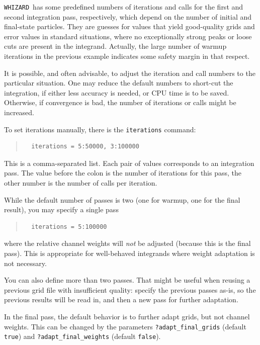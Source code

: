 \documentclass[12pt]{book}
\newcommand{\ttt}[1]{\texttt{#1}}
\newcommand{\whizard}{\texttt{WHIZARD}}
\begin{document}
\whizard\ has some predefined numbers of iterations and calls for the first
and second integration pass, respectively, which depend on the number of
initial and final-state particles.  They are guesses for values that yield
good-quality grids and error values in standard situations, where no
exceptionally strong peaks or loose cuts are present in the integrand.
Actually, the large number of warmup iterations in the previous example
indicates some safety margin in that respect.

It is possible, and often advisable, to adjust the iteration and call numbers
to the particular situation.  One may reduce the default numbers to short-cut
the integration, if either less accuracy is needed, or CPU time is to be
saved.  Otherwise, if convergence is bad, the number of iterations or calls
might be increased.

To set iterations manually, there is the \ttt{iterations} command:
\begin{quote}
\begin{footnotesize}
\begin{verbatim}
  iterations = 5:50000, 3:100000  
\end{verbatim}
\end{footnotesize}
\end{quote}
This is a comma-separated list.  Each pair of values corresponds to an
integration pass.  The value before the colon is the number of iterations for
this pass, the other number is the number of calls per iteration.  

While the default number of passes is two (one for warmup, one for the final
result), you may specify a single pass
\begin{quote}
\begin{footnotesize}
\begin{verbatim}
  iterations = 5:100000  
\end{verbatim}
\end{footnotesize}
\end{quote}
where the relative channel weights will \emph{not} be adjusted (because this
is the final pass).  This is appropriate for well-behaved integrands where
weight adaptation is not necessary.

You can also define more than two passes.  That might be useful when reusing a
previous grid file with insufficient quality: specify the previous passes
as-is, so the previous results will be read in, and then a new pass for
further adaptation.

In the final pass, the default behavior is to further adapt grids, but not
channel weights.  This can be changed by the parameters
\verb|?adapt_final_grids| (default \ttt{true}) and 
\verb|?adapt_final_weights| (default \ttt{false}).
\end{document}
